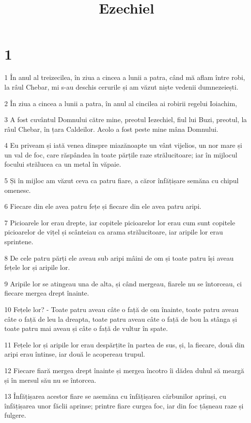 

\title{Ezechiel}


\chapter{1}

\par 1 În anul al treizecilea, în ziua a cincea a lunii a patra, când mă aflam între robi, la râul Chebar, mi s-au deschis cerurile și am văzut niște vedenii dumnezeiești.
\par 2 În ziua a cincea a lunii a patra, în anul al cincilea ai robirii regelui Ioiachim,
\par 3 A fost cuvântul Domnului către mine, preotul Iezechiel, fiul lui Buzi, preotul, la râul Chebar, în țara Caldeilor. Acolo a fost peste mine mâna Domnului.
\par 4 Eu priveam și iată venea dinspre miazănoapte un vânt vijelios, un nor mare și un val de foc, care răspândea în toate părțile raze strălucitoare; iar în mijlocul focului strălucea ca un metal în văpaie.
\par 5 Și în mijloc am văzut ceva ca patru fiare, a căror înfățișare semăna cu chipul omenesc.
\par 6 Fiecare din ele avea patru fețe și fiecare din ele avea patru aripi.
\par 7 Picioarele lor erau drepte, iar copitele picioarelor lor erau cum sunt copitele picioarelor de vițel și scânteiau ca arama strălucitoare, iar aripile lor erau sprintene.
\par 8 De cele patru părți ele aveau sub aripi mâini de om și toate patru își aveau fețele lor și aripile lor.
\par 9 Aripile lor se atingeau una de alta, și când mergeau, fiarele nu se întorceau, ci fiecare mergea drept înainte.
\par 10 Fețele lor? - Toate patru aveau câte o față de om înainte, toate patru aveau câte o față de leu la dreapta, toate patru aveau câte o față de bou la stânga și toate patru mai aveau și câte o față de vultur în spate.
\par 11 Fețele lor și aripile lor erau despărțite în partea de sus, și, la fiecare, două din aripi erau întinse, iar două le acopereau trupul.
\par 12 Fiecare fiară mergea drept înainte și mergea încotro îi dădea duhul să meargă și în mersul său nu se întorcea.
\par 13 Înfățișarea acestor fiare se asemăna cu înfățișarea cărbunilor aprinși, cu înfățișarea unor făclii aprinse; printre fiare curgea foc, iar din foc țâșneau raze și fulgere.
